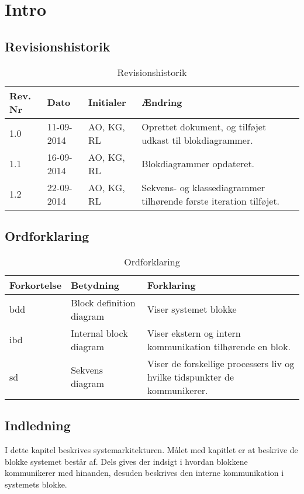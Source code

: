 \chapter{Intro}

\section{Revisionshistorik}
\begin{table}[H]
	\centering
		\begin{tabular}{|p{2 cm}|p{2 cm}|p{3 cm}|p{6 cm}|} 
		\hline
			\textbf{Rev. Nr} & \textbf{Dato}		& \textbf{Initialer} 	& \textbf{Ændring} \\ \hline
			1.0 	& 11-09-2014 & AO, KG, RL  & Oprettet dokument, og tilføjet udkast til blokdiagrammer.  \\ \hline
			1.1 	& 16-09-2014 & AO, KG, RL  & Blokdiagrammer opdateret. 	\\ \hline
			1.2 	& 22-09-2014 & AO, KG, RL  & Sekvens- og klassediagrammer tilhørende første iteration tilføjet.	\\ \hline
		\end{tabular}
	\caption{Revisionshistorik}
\end{table}

\vspace{1.5cm}

\section{Ordforklaring}
\begin{table}[H]
	\centering
		\begin{tabular}{|p{2.5cm}|p{4.5 cm}|p{6.5 cm}|} 
		\hline
			\textbf{Forkortelse} & \textbf{Betydning} & \textbf{Forklaring} \\ \hline
			 bdd& Block definition diagram  & Viser systemet blokke  \\ \hline
			 ibd& Internal block diagram & Viser ekstern og intern kommunikation tilhørende en blok. \\ \hline
			 sd& Sekvens diagram & Viser de forskellige processers liv og hvilke tidspunkter de kommunikerer. \\ \hline
		\end{tabular}
	\caption{Ordforklaring}
\end{table}

\vspace{2cm}

\section{Indledning}
I dette kapitel beskrives systemarkitekturen. Målet med kapitlet er at beskrive de blokke systemet består af. Dels gives der indsigt i hvordan blokkene kommunikerer med hinanden, desuden beskrives den interne kommunikation i systemets blokke. 